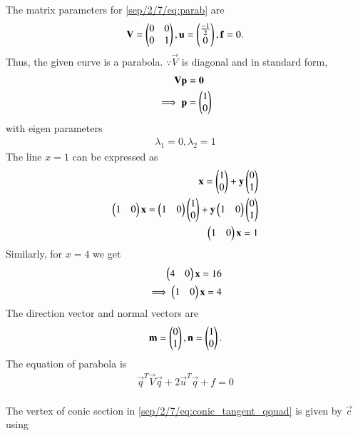 

The matrix parameters  for \eqref{sep/2/7/eq:parab} are
\begin{align}
\mathbf{V} = \begin{pmatrix}0 & 0\\0 & 1\end{pmatrix}, \mathbf{u} = \begin{pmatrix}\frac{-1}{2}\\0\end{pmatrix}, \mathbf{f}=0.
\label{sep/2/7/eq:parab_twovar_params}
\end{align}
Thus, the given curve is a parabola.  $\because \vec{V}$ is diagonal and in standard form,
\begin{align}
\mathbf{V}\mathbf{p} &= \mathbf{0}
\\
\implies \mathbf{p} &= \begin{pmatrix}1\\0\end{pmatrix}
\label{sep/2/7/eq:parab_twovar_p}
\end{align}
with eigen parameters
\begin{align}
\lambda_1=0, \lambda_2=1
\end{align}
The line   $x=1$  can be expressed as
\begin{align}
\mathbf{x}=\begin{pmatrix}1\\0\end{pmatrix}+\mathbf{y}\begin{pmatrix}0\\1\end{pmatrix}\\
\begin{pmatrix}1 & 0\end{pmatrix}\mathbf{x}=\begin{pmatrix}1 & 0\end{pmatrix}\begin{pmatrix}1\\0\end{pmatrix}+\mathbf{y}\begin{pmatrix}1 & 0\end{pmatrix}\begin{pmatrix}0\\1\end{pmatrix}\\
\begin{pmatrix}1 & 0\end{pmatrix}\mathbf{x}=1\label{sep/2/7/eq:line1}
\end{align}
Similarly, for ${x}=4$ we get
\begin{align}\label{sep/2/7/eq:line2}
\begin{pmatrix}4 & 0\end{pmatrix}\mathbf{x}=16\\
\implies\begin{pmatrix}1 & 0\end{pmatrix}\mathbf{x}=4
\end{align}
The direction vector and normal vectors are
\begin{align}
\mathbf{m} = \begin{pmatrix}0\\1\end{pmatrix}, \mathbf{n} = \begin{pmatrix}1\\0\end{pmatrix}.
\label{sep/2/7/eq:parab_twovar_mn}
\end{align}
The equation of parabola is
\begin{align}
\vec{q}^T\vec{V}\vec{q} + 2\vec{u}^T\vec{q} +f = 0
\label{sep/2/7/eq:conic_tangent_qquad}
\end{align}\\
The vertex of conic section in \eqref{sep/2/7/eq:conic_tangent_qquad} is given by $\vec{c}$ using  
